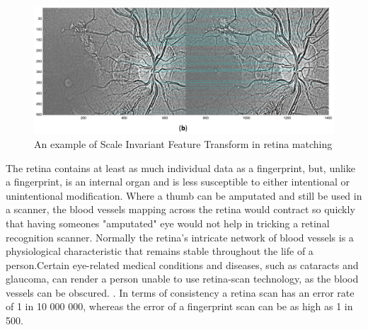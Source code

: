 \begin{figure}[htbp]
\centering
 \includegraphics{figures/sift}
\caption{An example of Scale Invariant Feature Transform in retina matching}
\label{fig:sift}
\end{figure}

The retina contains at least as much individual data as a fingerprint, but, unlike
a fingerprint, is an internal organ and is less susceptible to either intentional
or unintentional modification. Where a thumb can be amputated and still be used in
a scanner, the blood vessels mapping across the retina would contract so quickly
that having someones "amputated" eye would not help in tricking a retinal recognition
scanner. Normally the retina’s intricate network of blood vessels is a physiological
characteristic that remains stable throughout the life of a person.Certain eye-related
medical conditions and diseases, such as cataracts and glaucoma, can render a person
unable to use retina-scan technology, as the blood vessels can be obscured.
\cite{rarr_2015}.  In terms of consistency a retina scan has an error rate of
1 in 10 000 000, whereas the error of a fingerprint scan can be as high as 1 in 500.

